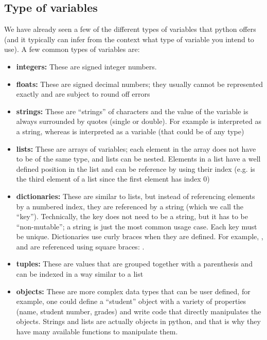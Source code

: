 \subsection{Type of variables}
We have already seen a few of the different types of variables that python offers (and it typically can infer from the context what type of variable you intend to use). A few common types of variables are:
\begin{itemize}
\item \textbf{integers:} These are signed integer numbers.
\item \textbf{floats:} These are signed decimal numbers; they usually cannot be represented exactly and are subject to round off errors
\item \textbf{strings:} These are ``strings'' of characters and the value of the variable is always surrounded by quotes (single or double). For example  is interpreted as a string, whereas  is interpreted as a variable (that could be of any type)
\item \textbf{lists:} These are arrays of variables; each element in the array does not have to be of the same type, and lists can be nested. Elements in a list have a well defined position in the list and can be reference by using their index (e.g.  is the third element of a list since the first element has index 0)
\item \textbf{dictionaries:} These are similar to lists, but instead of referencing elements by a numbered index, they are referenced by a string (which we call the ``key''). Technically, the key does not need to be a string, but it has to be ``non-mutable''; a string is just the most common usage case. Each key must be unique. Dictionaries use curly braces when they are defined. For example, , and are referenced using square braces: . 
\item \textbf{tuples:} These are values that are grouped together with a parenthesis and can be indexed in a way similar to a list
\item \textbf{objects:} These are more complex data types that can be user defined, for example, one could define a ``student'' object with a variety of properties (name, student number, grades) and write code that directly manipulates the objects. Strings and lists are actually objects in python, and that is why they have many available functions to manipulate them.
\end{itemize}

